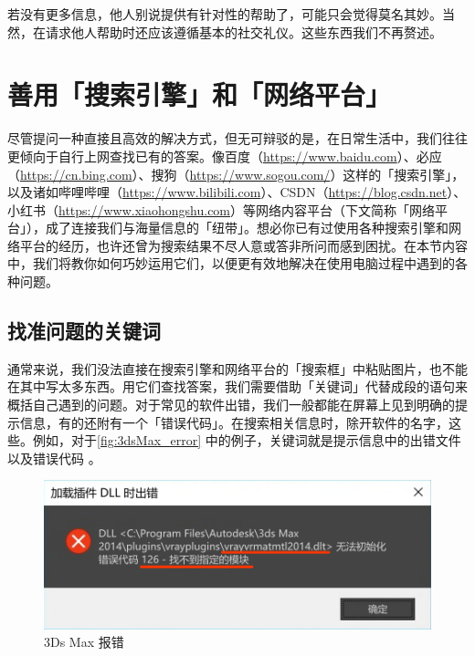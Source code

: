 若没有更多信息，他人别说提供有针对性的帮助了，可能只会觉得莫名其妙。当然，在请求他人帮助时还应该遵循基本的社交礼仪。这些东西我们不再赘述。

\section{善用「搜索引擎」和「网络平台」}

尽管提问一种直接且高效的解决方式，但无可辩驳的是，在日常生活中，我们往往更倾向于自行上网查找已有的答案。像百度（\url{https://www.baidu.com}）、必应（\url{https://cn.bing.com}）、搜狗（\url{https://www.sogou.com/}）这样的「搜索引擎」，以及诸如哔哩哔哩（\url{https://www.bilibili.com}）、CSDN（\url{https://blog.csdn.net}）、小红书（\url{https://www.xiaohongshu.com}）等网络内容平台（下文简称「网络平台」），成了连接我们与海量信息的「纽带」。想必你已有过使用各种搜索引擎和网络平台的经历，也许还曾为搜索结果不尽人意或答非所问而感到困扰。在本节内容中，我们将教你如何巧妙运用它们，以便更有效地解决在使用电脑过程中遇到的各种问题。

\subsection{找准问题的关键词}

通常来说，我们没法直接在搜索引擎和网络平台的「搜索框」中粘贴图片，也不能在其中写太多东西。用它们查找答案，我们需要借助「关键词」代替成段的语句来概括自己遇到的问题。对于常见的软件出错，我们一般都能在屏幕上见到明确的提示信息，有的还附有一个「错误代码」。在搜索相关信息时，除开软件的名字，这些。例如，对于\autoref{fig:3dsMax_error} 中的例子，关键词就是提示信息中的出错文件  以及错误代码 。

\begin{figure}[htb!]
  \centering
  \includegraphics[width=.85\textwidth]{assets/basic/3dsMax_error.png}
  \caption{3Ds Max 报错}
  \label{fig:3dsMax_error}
\end{figure}

